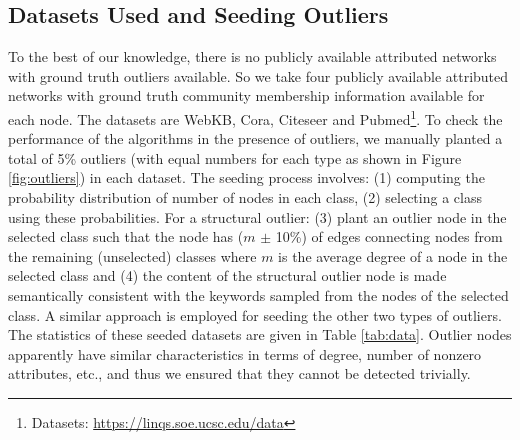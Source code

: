 \documentclass[letterpaper]{article} %
\begin{document}
\subsection{Datasets Used and Seeding Outliers}
To the best of our knowledge, there is no publicly available attributed networks with ground truth outliers available. So we take four publicly available attributed networks with ground truth community membership information available for each node. The datasets are WebKB, Cora, Citeseer and Pubmed\footnote[2]{Datasets: \url{https://linqs.soe.ucsc.edu/data}}.
To check the performance of the algorithms in the presence of outliers, we manually planted a total of 5\% outliers (with equal numbers for each type as shown in Figure \ref{fig:outliers}) in each dataset. The seeding process involves: (1) computing the probability distribution of number of nodes in each class, (2) selecting a class using these probabilities. For a structural outlier: (3) plant an outlier node in the selected class such that the node has ($m$ $\pm$ 10\%) of edges connecting nodes from the remaining (unselected) classes where $m$ is the average degree of a node in the selected class and (4) the content of the structural outlier node is made semantically consistent with the keywords sampled from the nodes of the selected class.
A similar approach is employed for seeding the other two types of outliers.
The statistics of these seeded datasets are given in Table \ref{tab:data}.
Outlier nodes apparently have similar characteristics in terms of degree, number of nonzero attributes, etc., and thus we ensured that they cannot be detected trivially.

\begin{table}
    \caption{Summary of the datasets (after planting outliers).} %
	\centering
	\label{tab:data}
	\end{table} %
\end{document}
